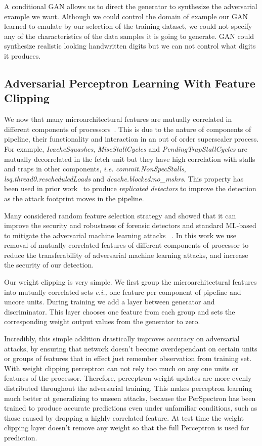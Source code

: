 A conditional GAN allows us to direct the generator to synthesize the adversarial example we want. Although we could control the domain of example our GAN learned to emulate by our selection of the training dataset, we could not specify any of the characteristics of the data samples it is going to generate. GAN could synthesize realistic looking handwritten digits but we can not control what digits it produces.


\subsection{Adversarial Perceptron Learning With Feature Clipping}
We now that many microarchitectural features are mutually correlated in different components of processors~\cite{PerSpectron}. This is due to the nature of components of pipeline, their functionality and interaction in an out of order superscaler process. For example, \textit{IcacheSquashes}, \textit{MiscStallCycles} and \textit{PendingTrapStallCycles} 
are mutually decorrelated in the fetch unit but they have high correlation with stalls 
and traps in other components, {\em i.e.} \textit{commit.NonSpecStalls}, 
\textit{lsq.thread0.rescheduledLoads} and \textit{dcache.blocked:no\_mshrs}. This property has been used in prior work~\cite{PerSpectron} to produce {\em replicated detectors} to improve the detection as the attack footprint moves in the pipeline.


Many considered random feature selection
strategy and showed that it can improve the security and robustness of forensic detectors and
standard ML-based to mitigate the adversarial machine learning attacks ~\cite{nowroozi2020survey, secureDetection2019}.
 In this work we use removal of mutually correlated features of different components of processor to reduce the transferability of adversarial machine learning attacks, and increase the security of our 
detection. 

Our weight clipping is very simple. We first group the microarchitectural features into mutually correlated sets {\em e.i.,} one feature per component of pipeline and uncore units. During training we add a layer between generator and discriminator. This layer chooses one feature from each group and sets the corresponding weight output values from the generator to zero.

Incredibly, this simple addition drastically improves accuracy on adversarial attacks, by ensuring that network doesn't become overdependant on certain units or groups of features that in effect just remember observation from training set. With weight clipping perceptron can not rely too much on any one units or features of the processor. Therefore, perceptron weight updates are more evenly distributed throughout the adversarial training. This makes perceptron learning much better at generalizing to unseen attacks, because the PerSpectron has been trained to produce accurate predictions even under unfamiliar conditions, such as those caused by dropping a highly correlated feature. At test time the weight clipping layer doesn't remove any weight so that the full Perceptron is used for prediction. 



